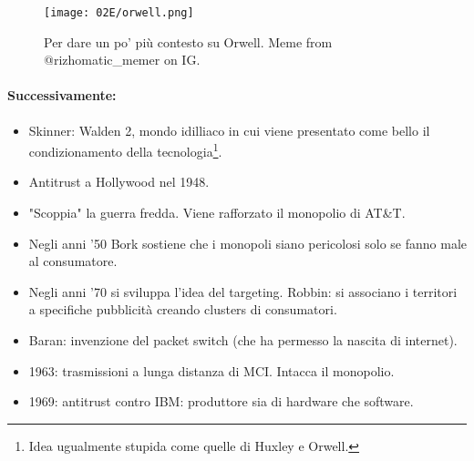 \begin{figure}[H]
    \centering
    \texttt{[image: 02E/orwell.png]}
    \caption{Per dare un po' più contesto su Orwell. Meme from @rizhomatic\_memer on IG.}
\end{figure}

\paragraph{Successivamente:}

\begin{itemize}
  \item Skinner: Walden 2, mondo idilliaco in cui viene presentato come bello il condizionamento della tecnologia\footnote{Idea ugualmente stupida come quelle di Huxley e Orwell.}. 
  \item Antitrust a Hollywood nel 1948.
  \item "Scoppia" la guerra fredda. Viene rafforzato il monopolio di AT\&T.
  \item Negli anni '50 Bork sostiene che i monopoli siano pericolosi solo se fanno male al consumatore. 
  \item Negli anni '70 si sviluppa l'idea del targeting. Robbin: si associano i territori a specifiche pubblicità creando clusters di consumatori. 
  \item Baran: invenzione del packet switch (che ha permesso la nascita di internet). 
  \item 1963: trasmissioni a lunga distanza di MCI. Intacca il monopolio. 
  \item 1969: antitrust contro IBM: produttore sia di hardware che software.
\end{itemize}








